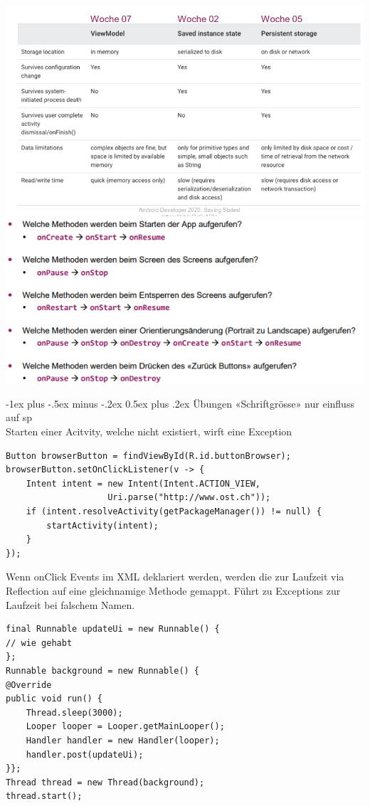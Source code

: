 \documentclass[10pt,landscape,a4paper]{article}
\makeatletter
\renewcommand{\section}{\@startsection{section}{1}{0mm}%
                                {-1ex plus -.5ex minus -.2ex}%
                                {0.5ex plus .2ex}%
                                {\normalfont\large\bfseries}}
\makeatother
\begin{document}
\begin{multicols*}{3}
\includegraphics[scale=0.5]{Bilder/StorageLocationt.PNG}
\includegraphics[scale=0.45]{Bilder/welcheMethodenAktion.png}

\section{Übungen}
«Schriftgrösse» nur einfluss auf sp\\
Starten einer Acitvity, welche nicht existiert, wirft eine Exception
\begin{verbatim}
Button browserButton = findViewById(R.id.buttonBrowser);
browserButton.setOnClickListener(v -> {
    Intent intent = new Intent(Intent.ACTION_VIEW,
                    Uri.parse("http://www.ost.ch"));
    if (intent.resolveActivity(getPackageManager()) != null) {
        startActivity(intent);
    }
});
\end{verbatim}
Wenn onClick Events im XML deklariert werden, werden die zur Laufzeit via Reflection auf eine gleichnamige Methode gemappt. Führt zu Exceptions zur Laufzeit bei falschem Namen.

\begin{verbatim}
final Runnable updateUi = new Runnable() {
// wie gehabt
};
Runnable background = new Runnable() {
@Override
public void run() {
    Thread.sleep(3000);
    Looper looper = Looper.getMainLooper();
    Handler handler = new Handler(looper);
    handler.post(updateUi);
}};
Thread thread = new Thread(background);
thread.start();
\end{verbatim}
\end{multicols*}
\end{document}

